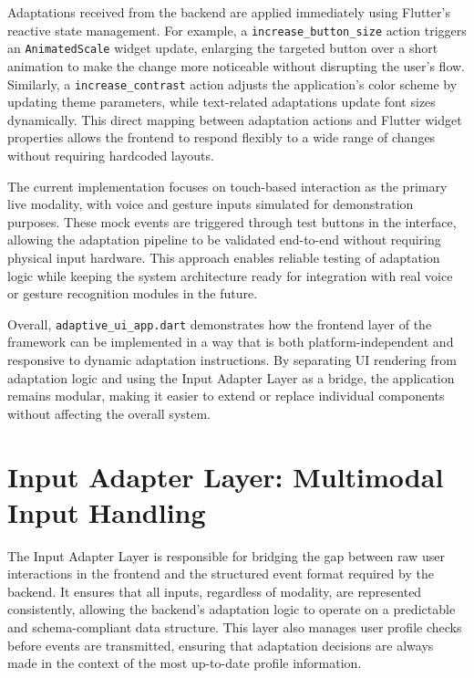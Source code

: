 \documentclass[openany]{book}
\begin{document}
Adaptations received from the backend are applied immediately using Flutter’s reactive state management. For example, a \texttt{increase\_button\_size} action triggers an \texttt{AnimatedScale} widget update, enlarging the targeted button over a short animation to make the change more noticeable without disrupting the user’s flow. Similarly, a \texttt{increase\_contrast} action adjusts the application’s color scheme by updating theme parameters, while text-related adaptations update font sizes dynamically. This direct mapping between adaptation actions and Flutter widget properties allows the frontend to respond flexibly to a wide range of changes without requiring hardcoded layouts.

The current implementation focuses on touch-based interaction as the primary live modality, with voice and gesture inputs simulated for demonstration purposes. These mock events are triggered through test buttons in the interface, allowing the adaptation pipeline to be validated end-to-end without requiring physical input hardware. This approach enables reliable testing of adaptation logic while keeping the system architecture ready for integration with real voice or gesture recognition modules in the future.

Overall, \texttt{adaptive\_ui\_app.dart} demonstrates how the frontend layer of the framework can be implemented in a way that is both platform-independent and responsive to dynamic adaptation instructions. By separating UI rendering from adaptation logic and using the Input Adapter Layer as a bridge, the application remains modular, making it easier to extend or replace individual components without affecting the overall system.

\section{Input Adapter Layer: Multimodal Input Handling}
The Input Adapter Layer is responsible for bridging the gap between raw user interactions in the frontend and the structured event format required by the backend. It ensures that all inputs, regardless of modality, are represented consistently, allowing the backend’s adaptation logic to operate on a predictable and schema-compliant data structure. This layer also manages user profile checks before events are transmitted, ensuring that adaptation decisions are always made in the context of the most up-to-date profile information.
\end{document}
